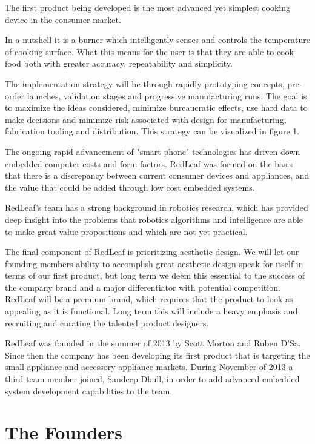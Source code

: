 \documentclass[11pt]{article}
\theoremstyle{definition}
\begin{document}
The first product being developed is the most advanced yet simplest cooking device in the consumer market.

In a nutshell it is a burner which intelligently senses and controls the temperature of cooking surface. What this means for the user is that they are able to cook food both with greater accuracy, repeatability and simplicity.





The implementation strategy will be through rapidly prototyping concepts, pre-order launches, validation stages and progressive manufacturing runs. The goal is to maximize the ideas considered, minimize bureaucratic effects, use hard data to make decisions and minimize risk associated with design for manufacturing, fabrication tooling and distribution. This strategy can be visualized in figure 1.

The ongoing rapid advancement of "smart phone" technologies has driven down embedded computer costs and form factors. RedLeaf was formed on the basis that there is a discrepancy between current consumer devices and appliances, and the value that could be added through low cost embedded systems. 

RedLeaf's team has a strong background in robotics research, which has provided deep insight into the problems that robotics algorithms and intelligence are able to make great value propositions and which are not yet practical.

The final component of RedLeaf is prioritizing aesthetic design. We will let our founding members ability to accomplish great aesthetic design speak for itself in terms of our first product, but long term we deem this essential to the success of the company brand and a major differentiator with potential competition. RedLeaf will be a premium brand, which requires that the product to look as appealing as it is functional. Long term this will include a heavy emphasis and recruiting and curating the talented product designers.

RedLeaf was founded in the summer of 2013 by Scott Morton and Ruben D'Sa. Since then the company has been developing its first product that is targeting the small appliance and accessory appliance markets. During November of 2013 a third team member joined, Sandeep Dhull, in order to add advanced embedded system development capabilities to the team.



\section{The Founders}
\end{document}
